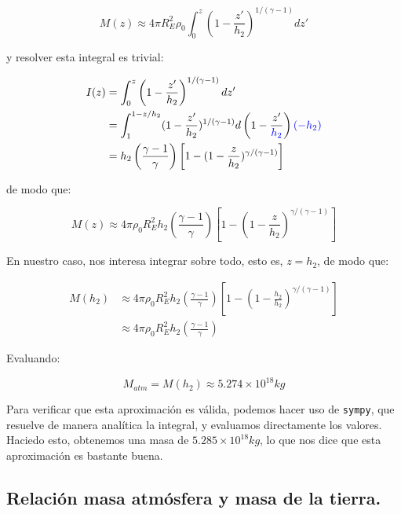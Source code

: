\begin{equation}
    M(z) \approx 4 \pi R_E^2 \rho_0 \int_{0}^{z} \left( 1- \frac{z'}{h_2} \right)^{1/(\gamma - 1)} dz'  \label{eq:Masa_approx}
\end{equation}

y resolver esta integral es trivial:

\begin{align*}
    I(z) &= \int_{0}^{z} \left( 1- \frac{z'}{h_2} \right)^{1/(\gamma - 1)} dz' \\
    &= \int_{1}^{1-z/h_2} (1-\frac{z'}{h_2})^{1/(\gamma - 1)} d\left(1-\frac{z'}{ \textcolor{blue}{ h_2 }}\right) \textcolor{blue}{(-h_2)} \\
    &= h_2 \left( \frac{\gamma - 1}{\gamma} \right) \left[ 1 -  (1-\frac{z}{h_2})^{\gamma/(\gamma - 1)} \right]
\end{align*}

de modo que:

\begin{equation}
    \boxed{M(z) \approx 4 \pi \rho_0 R_E^2  h_2 \left( \frac{\gamma - 1}{\gamma} \right) \left[ 1 -  (1-\frac{z}{h_2})^{\gamma/(\gamma - 1)} \right]} \label{eq:Masa_approx_expresion}
\end{equation}

En nuestro caso, nos interesa integrar sobre todo, esto es, $z = h_2$, de modo que:

\begin{align*}
    M(h_2) &\approx 4 \pi \rho_0 R_E^2  h_2 \left( \frac{\gamma - 1}{\gamma} \right) \left[ 1 -  (1-\frac{h_2}{h_2})^{\gamma/(\gamma - 1)} \right] \\
     &\approx 4 \pi \rho_0 R_E^2  h_2 \left( \frac{\gamma - 1}{\gamma} \right)
\end{align*}

Evaluando: 

\begin{equation}
    \boxed{M_{atm} = M(h_2) \approx 5.274 \times 10^{18} kg} \label{eq:Masa_atm}
\end{equation}

Para verificar que esta aproximación es válida, podemos hacer uso de \texttt{sympy}, que resuelve de manera analítica la integral, y evaluamos directamente los valores. Haciedo esto, obtenemos una masa de $5.285 \times 10^{18} kg$, lo que nos dice que esta aproximación es bastante buena.

\subsection{Relación masa atmósfera y masa de la tierra.}

